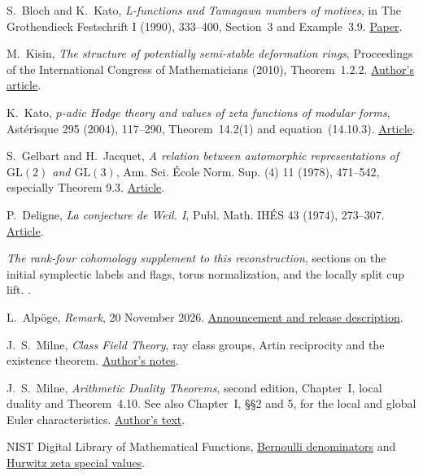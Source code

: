 S.~Bloch and K.~Kato, \emph{L-functions and Tamagawa numbers
of motives}, in The Grothendieck Festschrift I (1990), 333--400,
Section~3 and Example~3.9.
\href{https://math.stanford.edu/~conrad/BSDseminar/refs/BKTamagawa.pdf}{Paper}.

M.~Kisin, \emph{The structure of potentially semi-stable
deformation rings}, Proceedings of the International
Congress of Mathematicians (2010), Theorem~1.2.2.
\href{https://people.math.harvard.edu/~kisin/dvifiles/licm.pdf}{Author's article}.

K.~Kato, \emph{\(p\)-adic Hodge theory and values of zeta
functions of modular forms}, Ast\'erisque 295 (2004), 117--290,
Theorem~14.2(1) and equation~(14.10.3).
\href{https://numdam.org/item/AST_2004__295__117_0.pdf#page=119}{Article}.

S.~Gelbart and H.~Jacquet,
\emph{A relation between automorphic representations of
\(\mathrm{GL}(2)\) and \(\mathrm{GL}(3)\)},
Ann. Sci. \'Ecole Norm. Sup. (4) 11 (1978), 471--542,
especially Theorem 9.3.
\href{https://www.numdam.org/articles/10.24033/asens.1355/}{Article}.

P.~Deligne, \emph{La conjecture de Weil. I},
Publ. Math. IH\'ES 43 (1974), 273--307.
\href{https://www.numdam.org/articles/10.1007/BF02684373/}{Article}.

\emph{The rank-four cohomology supplement to this reconstruction},
sections on the initial symplectic labels and flags, torus
normalization, and the locally split cup lift.
\rankfourreference.

L.~Alp\"oge, \emph{Remark}, 20 November 2026.
\href{https://alpo.ge/remark.pdf}{Announcement and release description}.

J.~S.~Milne, \emph{Class Field Theory},
ray class groups, Artin reciprocity and the existence theorem.
\href{https://www.jmilne.org/math/CourseNotes/CFT.pdf}{Author's notes}.

J.~S.~Milne, \emph{Arithmetic Duality Theorems}, second edition,
Chapter~I, local duality and Theorem~4.10.
See also Chapter~I, \S\S2 and 5, for the local and global
Euler characteristics.
\href{https://math.stanford.edu/~conrad/BSDseminar/refs/MilneADT.pdf}{Author's text}.

NIST Digital Library of Mathematical Functions,
\href{https://dlmf.nist.gov/24.10.E1}{Bernoulli denominators}
and \href{https://dlmf.nist.gov/25.11.E14}{Hurwitz zeta special values}.

